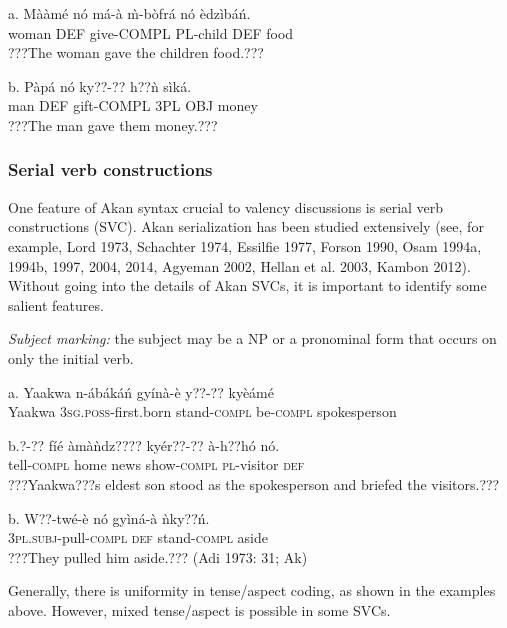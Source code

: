 \documentclass[output=paper]{langsci/langscibook}
\begin{document}
\ea
\gll a.  Mààmé    nó  má-à    \`{m}-bòfrá  nó  èdzìbáń.\\
       woman    DEF  give-COMPL  PL-child  DEF  food\\
\glt   ???The woman gave the children food.???
\z

\ea
\gll  b.  Pàpá  nó  ky??-??    h??ǹ    sìká.\\
       man  DEF  gift-COMPL  3PL OBJ  money\\
\glt   ???The man gave them money.???  
\z

\subsubsection{Serial verb constructions}

One feature of Akan syntax crucial to valency discussions is serial verb constructions (\textsc{SVC}). Akan serialization has been studied extensively (see, for example, Lord 1973, Schachter 1974, Essilfie 1977, Forson 1990, Osam 1994a, 1994b, 1997, 2004, 2014, Agyeman 2002, Hellan et al. 2003, Kambon 2012). Without going into the details of Akan SVCs, it is important to identify some salient features.

\begin{styleListei}
\emph{Subject marking:} the subject may be a NP or a pronominal form that occurs on only the initial verb. 
\end{styleListei}


\ea
\gll a.  Yaakwa  n-ábákáń     gyínà-è   y??-??     kyèámé\\
       Yaakwa  \textsc{3sg.poss}{}-first.born  stand-\textsc{compl}  be-\textsc{compl}   spokesperson\\
       \z
       
\ea
\gll b.?-??     fíé   àmàǹdz????  kyér??-??   à-h??hó    nó.\\
       tell-\textsc{compl}  home  news    show-\textsc{compl}  \textsc{pl}{}-visitor  \textsc{def}\\
\glt   ???Yaakwa???s eldest son stood as the spokesperson and briefed the visitors.??? \citep[83]{Krampah1970}
\z

\ea
\gll  b.  W??-twé-è    nó  gyìná-à  ǹky??ń.\\
       \textsc{3pl.subj}{}-pull\textsc{{}-compl}  \textsc{def}  stand-\textsc{compl}  aside\\
\glt   ???They pulled him aside.??? (Adi 1973: 31; Ak)
\z

Generally, there is uniformity in tense/aspect coding, as shown in the examples above. However, mixed tense/aspect is possible in some SVCs. 
\end{document}
